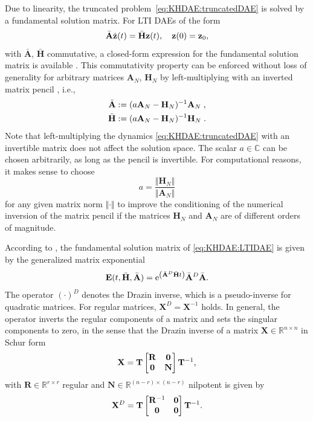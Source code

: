 \documentclass[a4paper, nonatbib, 3p, twocolumn]{elsarticle}
\theoremstyle{plain}
\theoremstyle{definition}
\theoremstyle{remark}
\newcommand{\ex}{\re} %
\newcommand{\Rspace}{\mathbb{R}}
\newcommand{\re}{\mathrm e}
\newcommand{\vz}{\mathbf z}
\newcommand{\vA}{\mathbf A}
\newcommand{\vE}{\mathbf E}
\newcommand{\vH}{\mathbf H}
\newcommand{\vN}{\mathbf N}
\newcommand{\vR}{\mathbf R}
\newcommand{\vT}{\mathbf T}
\newcommand{\vX}{\mathbf X}
\begin{document}
Due to linearity, the truncated problem~\eqref{eq:KHDAE:truncatedDAE}
is solved by a fundamental solution matrix.
For LTI DAEs of the form
\begin{equation}\label{eq:KHDAE:LTIDAE}
	\bar{\vA}\dot{\vz}(t)=\bar{\vH}\vz(t), \quad \vz(0)=\vz_0\textnormal{,}
\end{equation}
with $\bar{\vA}$, $\bar{\vH}$ commutative, a closed-form expression for the fundamental solution matrix is available \cite{Campbell1976}.
This commutativity property can be enforced without loss of generality for arbitrary matrices $\vA_N$, $\vH_N$ by left-multiplying with an inverted matrix pencil \cite{Golub1986}, i.e.,
\begin{subequations}
    \begin{align}
        \Bar{\vA}&:=(a\vA_N-\vH_N)^{-1}\vA_N\;\textnormal{,}\\
        \Bar{\vH}&:=(a\vA_N-\vH_N)^{-1}\vH_N\;\textnormal{.}
    \end{align}
\end{subequations}
Note that left-multiplying the dynamics \eqref{eq:KHDAE:truncatedDAE} with an invertible matrix does not affect the solution space. The scalar $a\in\mathbb{C}$ can be chosen arbitrarily, as long as the pencil is invertible.
For computational reasons, it makes sense to choose
\begin{equation}
	a = \frac{\Vert\vH_N\Vert}{\Vert\vA_N\Vert}
\end{equation}
for any given matrix norm $\Vert\cdot\Vert$ to improve the conditioning of the numerical inversion of the matrix pencil if the matrices $\vH_N$ and $\vA_N$ are of different orders of magnitude.

According to \cite{Campbell1976}, the fundamental solution matrix of \eqref{eq:KHDAE:LTIDAE} is given by
the generalized matrix exponential
\begin{equation}\label{eq:KHDAE:generalizedExp}
	\vE(t,\bar{\vH},\bar{\vA}) = \ex^{\left(\Bar{\vA}^D\Bar{\vH} t\right)}\bar{\vA}^D\bar{\vA}\textnormal{.}
\end{equation}
The operator $(\cdot)^D$ denotes the Drazin inverse, which is a pseudo-inverse for quadratic matrices.
For regular matrices, $\vX^D=\vX^{-1}$ holds.
In general, the operator inverts the regular components of a matrix and sets the singular components to zero, in the sense that the Drazin inverse of a matrix $\vX\in\Rspace^{n\times n}$ in Schur form
\begin{equation}\label{eq:KHDAE:preDrazin}
	\vX = \vT\begin{bmatrix}
		\vR & \mathbf{0} \\ \mathbf{0} & \vN
	\end{bmatrix}\vT^{-1}\textnormal{,}
\end{equation}
with $\vR \in \mathbb{R}^{r\times r}$ regular and $\vN \in \mathbb{R}^{(n-r)\times (n-r)}$ nilpotent is given by
\begin{equation}\label{eq:KHDAE:postDrazin}
	\vX^D = \vT\begin{bmatrix}
		\vR^{-1} & \mathbf{0} \\ \mathbf{0} & \mathbf{0}
	\end{bmatrix}\vT^{-1}\textnormal{.}
\end{equation}
\end{document}
